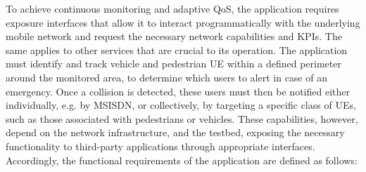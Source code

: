 To achieve continuous monitoring and adaptive \acs{QoS}, the application requires exposure interfaces that allow it to interact programmatically with the underlying mobile network and request the necessary network capabilities and \acsp{KPI}. The same applies to other services that are crucial to its operation. The application must identify and track vehicle and pedestrian \acs{UE} within a defined perimeter around the monitored area, to determine which users to alert in case of an emergency. Once a collision is detected, these users must then be notified either individually, e.g. by \acs{MSISDN}, or collectively, by targeting a specific class of \acsp{UE}, such as those associated with pedestrians or vehicles. These capabilities, however, depend on the network infrastructure, and the testbed, exposing the necessary functionality to third-party applications through appropriate interfaces. Accordingly, the functional requirements of the application are defined as follows:

